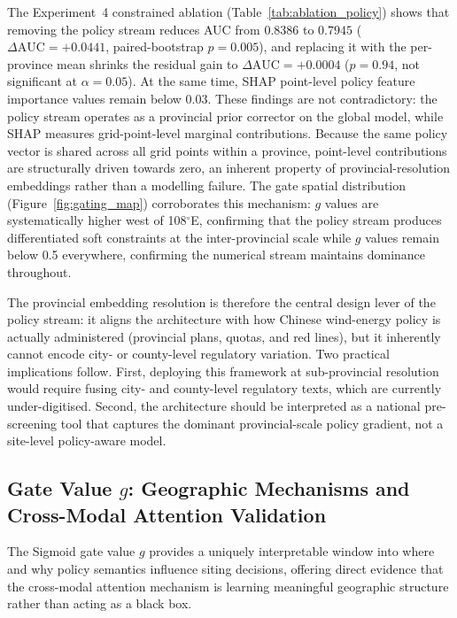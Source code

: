 \documentclass[12pt, a4paper]{article}
\begin{document}
The Experiment~4 constrained ablation
(Table~\ref{tab:ablation_policy}) shows that removing the policy
stream reduces AUC from $0.8386$ to $0.7945$
($\Delta\text{AUC}=+0.0441$, paired-bootstrap $p=0.005$),
and replacing it with the per-province mean shrinks the
residual gain to
$\Delta\text{AUC}=+0.0004$ ($p=0.94$, not significant at
$\alpha=0.05$). At the same time, SHAP point-level policy
feature importance values remain below $0.03$. These findings
are not contradictory: the policy stream operates as a
provincial prior corrector on the global model, while SHAP
measures grid-point-level marginal contributions. Because the
same policy vector is shared across all grid points within a
province, point-level contributions are structurally driven
towards zero, an inherent property of provincial-resolution
embeddings rather than a modelling failure. The gate spatial
distribution (Figure~\ref{fig:gating_map}) corroborates this
mechanism: $g$ values are systematically higher west of
108$^\circ$E, confirming that the policy stream produces
differentiated soft constraints at the inter-provincial scale
while $g$ values remain below 0.5 everywhere, confirming the
numerical stream maintains dominance throughout.

The provincial embedding resolution is therefore the central
design lever of the policy stream: it aligns the architecture
with how Chinese wind-energy policy is actually administered
(provincial plans, quotas, and red lines), but it inherently
cannot encode city- or county-level regulatory variation. Two
practical implications follow. First, deploying this
framework at sub-provincial resolution would require fusing
city- and county-level regulatory texts, which are currently
under-digitised. Second, the architecture should be
interpreted as a national pre-screening tool that captures
the dominant provincial-scale policy gradient, not a
site-level policy-aware model.

\subsection{Gate Value $g$: Geographic Mechanisms and
Cross-Modal Attention Validation}
\label{sec:gating}

The Sigmoid gate value $g$ provides a uniquely interpretable
window into where and why policy semantics influence siting
decisions, offering direct evidence that the cross-modal
attention mechanism is learning meaningful geographic
structure rather than acting as a black box.
\end{document}
